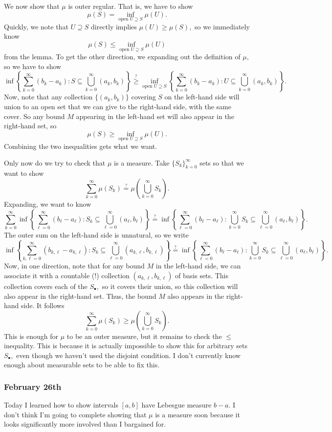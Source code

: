 We now show that $\mu$ is outer regular. That is, we have to show
\[\mu(S)=\inf_{\text{open }U\supseteq S}\mu(U).\]
Quickly, we note that $U\supseteq S$ directly implies $\mu(U)\ge\mu(S),$ so we immediately know
\[\mu(S)\le\inf_{\text{open }U\supseteq S}\mu(U)\]
from the lemma. To get the other direction, we expanding out the definition of $\mu,$ so we have to show
\[\inf\left\{\sum_{k=0}^\infty(b_k-a_k):S\subseteq\bigcup_{k=0}^\infty(a_k,b_k)\right\}\stackrel?\ge\inf_{\text{open }U\supseteq S}\left\{\sum_{k=0}^\infty(b_k-a_k):U\subseteq\bigcup_{k=0}^\infty(a_k,b_k)\right\}.\]
Now, note that any collection $\{(a_k,b_k)\}$ covering $S$ on the left-hand side will union to an open set that we can give to the right-hand side, with the same cover. So any bound $M$ appearing in the left-hand set will also appear in the right-hand set, so
\[\mu(S)\ge\inf_{\text{open }U\supseteq S}\mu(U).\]
Combining the two inequalities gets what we want.

Only now do we try to check that $\mu$ is a measure. Take $\{S_k\}_{k=0}^\infty$ sets so that we want to show
\[\sum_{k=0}^\infty\mu(S_k)\stackrel?=\mu\left(\bigcup_{k=0}^\infty S_k\right).\]
Expanding, we want to know
\[\sum_{k=0}^\infty\inf\left\{\sum_{\ell=0}^\infty(b_\ell-a_\ell):S_k\subseteq\bigcup_{\ell=0}^\infty(a_\ell,b_\ell)\right\}\stackrel?=\inf\left\{\sum_{\ell=0}^\infty(b_\ell-a_\ell):\bigcup_{k=0}^\infty S_k\subseteq\bigcup_{\ell=0}^\infty(a_\ell,b_\ell)\right\}.\]
The outer sum on the left-hand side is unnatural, so we write
\[\inf\left\{\sum_{k,\ell=0}^\infty(b_{k,\ell}-a_{k,\ell}):S_k\subseteq\bigcup_{\ell=0}^\infty(a_{k,\ell},b_{k,\ell})\right\}\stackrel?=\inf\left\{\sum_{\ell=0}^\infty(b_\ell-a_\ell):\bigcup_{k=0}^\infty S_k\subseteq\bigcup_{\ell=0}^\infty(a_\ell,b_\ell)\right\}.\]
Now, in one direction, note that for any bound $M$ in the left-hand side, we can associate it with a countable (!) collection $(a_{k,\ell},b_{k,\ell})$ of basis sets. This collection covers each of the $S_\bullet,$ so it covers their union, so this collection will also appear in the right-hand set. Thus, the bound $M$ also appears in the right-hand side. It follows
\[\sum_{k=0}^\infty\mu(S_k)\ge\mu\left(\bigcup_{k=0}^\infty S_k\right).\]
This is enough for $\mu$ to be an outer measure, but it remains to check the $\le$ inequality. This is because it is actually impossible to show this for arbitrary sets $S_\bullet,$ even though we haven't used the disjoint condition. I don't currently know enough about measurable sets to be able to fix this.

\subsubsection{February 26th}
Today I learned how to show intervals $[a,b]$ have Lebesgue measure $b-a.$ I don't think I'm going to complete showing that $\mu$ is a measure soon because it looks significantly more involved than I bargained for.

